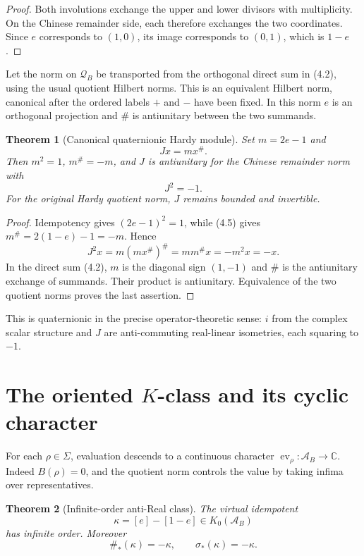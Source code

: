 \documentclass[11pt]{article}
\newtheorem{theorem}{Theorem}[section]
\theoremstyle{definition}
\theoremstyle{remark}
\newcommand{\C}{\mathbb C}
\newcommand{\A}{\mathcal A}
\newcommand{\Q}{\mathcal Q}
\newcommand{\ev}{\operatorname{ev}}
\begin{document}
\begin{proof}
Both involutions exchange the upper and lower divisors with multiplicity.  On
the Chinese remainder side, each therefore exchanges the two coordinates.
Since $e$ corresponds to $(1,0)$, its image corresponds to $(0,1)$, which is
$1-e$.
\end{proof}

Let the norm on $\Q_B$ be transported from the orthogonal direct sum in (4.2),
using the usual quotient Hilbert norms.  This is an equivalent Hilbert norm,
canonical after the ordered labels $+$ and $-$ have been fixed.  In this norm
$e$ is an orthogonal projection and $\#$ is antiunitary between the two
summands.

\begin{theorem}[Canonical quaternionic Hardy module]\label{thm:quaternion}
Set $m=2e-1$ and
\[
                         Jx=m x^\#.                   \tag{4.6}
\]
Then $m^2=1$, $m^\#=-m$, and $J$ is antiunitary for the Chinese remainder norm
with
\[
                         J^2=-1.                      \tag{4.7}
\]
For the original Hardy quotient norm, $J$ remains bounded and invertible.
\end{theorem}

\begin{proof}
Idempotency gives $(2e-1)^2=1$, while (4.5) gives
$m^\#=2(1-e)-1=-m$.  Hence
\[
 J^2x=m(m x^\#)^\#=mm^\#x=-m^2x=-x.
\]
In the direct sum (4.2), $m$ is the diagonal sign $(1,-1)$ and $\#$ is the
antiunitary exchange of summands.  Their product is antiunitary.  Equivalence of
the two quotient norms proves the last assertion.
\end{proof}

This is quaternionic in the precise operator-theoretic sense: $i$ from the
complex scalar structure and $J$ are anti-commuting real-linear isometries,
each squaring to $-1$.

\section{The oriented \texorpdfstring{$K$}{K}-class and its cyclic character}

For each $\rho\in\Sigma$, evaluation descends to a continuous character
$\ev_\rho:\A_B\to\C$.  Indeed $B(\rho)=0$, and the quotient norm controls the
value by taking infima over representatives.

\begin{theorem}[Infinite-order anti-Real class]\label{thm:kclass}
The virtual idempotent
\[
                 \kappa=[e]-[1-e]\in K_0(\A_B)       \tag{5.1}
\]
has infinite order.  Moreover
\[
                 \#_*(\kappa)=-\kappa,
                 \qquad \sigma_*(\kappa)=-\kappa.    \tag{5.2}
\]
\end{theorem}
\end{document}
